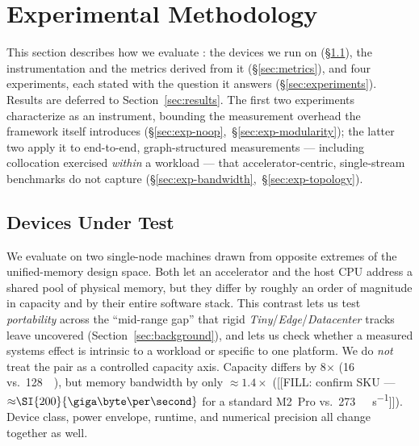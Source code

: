 \section{Experimental Methodology}
\label{sec:methodology}

This section describes how we evaluate \sysname{}: the devices we run on
(\S\ref{sec:duts}), the instrumentation and the metrics derived from it
(\S\ref{sec:metrics}), and four experiments, each stated with the question it
answers (\S\ref{sec:experiments}). Results are deferred to
Section~\ref{sec:results}. The first two experiments characterize \sysname{} as
an instrument, bounding the measurement overhead the framework itself
introduces (\S\ref{sec:exp-noop},~\S\ref{sec:exp-modularity}); the latter two
apply it to end-to-end, graph-structured measurements --- including collocation
exercised \emph{within} a workload --- that accelerator-centric, single-stream
benchmarks do not capture (\S\ref{sec:exp-bandwidth},~\S\ref{sec:exp-topology}).

\subsection{Devices Under Test}
\label{sec:duts}

We evaluate on two single-node machines drawn from opposite extremes of the
unified-memory design space. Both let an accelerator and the host CPU address a
shared pool of physical memory, but they differ by roughly an order of
magnitude in capacity and by their entire software stack. This contrast lets us
test \emph{portability} across the ``mid-range gap'' that rigid
\emph{Tiny}/\emph{Edge}/\emph{Datacenter} tracks leave uncovered
(Section~\ref{sec:background}), and lets us check whether a measured systems
effect is intrinsic to a workload or specific to one platform. We do \emph{not}
treat the pair as a controlled capacity axis. Capacity differs by \num{8}$\times$
(\SI{16}{\giga\byte} vs.\ \SI{128}{\giga\byte}), but memory bandwidth by only
${\approx}\num{1.4}\times$ ([[FILL: confirm SKU --- ${\approx}\SI{200}{\giga\byte\per\second}$
for a standard M2~Pro vs.\ \SI{273}{\giga\byte\per\second}]]). Device class,
power envelope, runtime, and numerical precision all change together as well.

